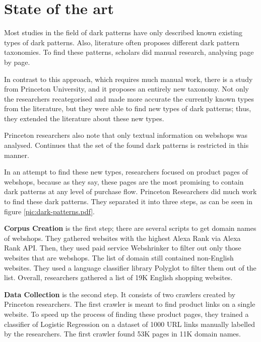 \chapter{State of the art}
Most studies\cite{dark-patterns-brignull,dark-patterns-colin,taxonomies-conti} in the field of dark patterns have only described known existing types of dark patterns. Also, literature often proposes different dark pattern taxonomies. To find these patterns, scholars did manual research, analysing page by page.

In contrast to this approach, which requires much manual work, there is a study from Princeton University\cite{dark-patterns-at-scale}, and it proposes an entirely new taxonomy. Not only the researchers recategorised and made more accurate the currently known types from the literature, but they were able to find new types of dark patterns; thus, they extended the literature about these new types.

Princeton researchers also note that only textual information on webshops was analysed. Continues that the set of the found dark patterns is restricted in this manner\cite{dark-patterns-at-scale}.

In an attempt to find these new types, researchers focused on product pages of webshops, because as they say, these pages are the most promising to contain dark patterns at any level of purchase flow\cite{dark-patterns-at-scale}. Princeton Researchers did much work to find these dark patterns. They separated it into three steps, as can be seen in figure \ref{pic:dark-patterns.pdf}.


\textbf{Corpus Creation} is the first step; there are several scripts to get domain names of webshops. They gathered websites with the highest Alexa Rank via Alexa Rank API. Then, they used paid service Webshrinker to filter out only those websites that are webshops. The list of domain still contained non-English websites. They used a language classifier library Polyglot to filter them out of the list. Overall, researchers gathered a list of 19K English shopping websites\cite{dark-patterns-at-scale}.

\textbf{Data Collection} is the second step. It consists of two crawlers created by Princeton researchers. The first crawler is meant to find product links on a single website. To speed up the process of finding these product pages, they trained a classifier of Logistic Regression on a dataset of 1000 URL links manually labelled by the researchers. The first crawler found 53K pages in 11K domain names.

